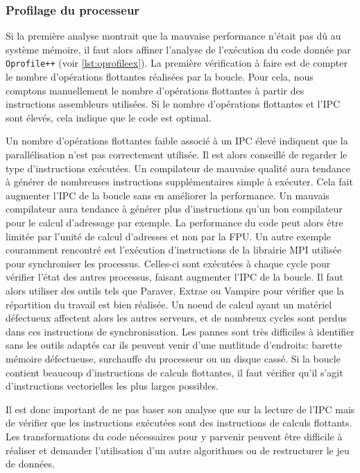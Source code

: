         
        
        \subsubsection{Profilage du processeur}
        
            Si la première analyse montrait que la mauvaise performance n'était pas dû au système mémoire, il faut alors affiner l'analyse de l'exécution du code donnée par \verb=Oprofile++= (voir \autoref{lst:oprofileex}).
            La première vérification à faire est de compter le nombre d'opérations flottantes réalisées par la boucle. Pour cela, nous comptons manuellement le nombre d'opérations flottantes à partir des instructions assembleurs utilisées. Si le nombre d'opérations flottantes et l'IPC sont élevés, cela indique que le code est optimal. 
            
            Un nombre d'opérations flottantes faible associé à un IPC élevé indiquent que la parallélisation n'est pas correctement utilisée. Il est alors conseillé de regarder le type d'instructions exécutées.
                Un compilateur de mauvaise qualité aura tendance à générer de nombreuses instructions supplémentaires simple à exécuter. Cela fait augmenter l'IPC de la boucle sans en améliorer la performance. Un mauvais compilateur aura tendance à générer plus d'instructions qu'un bon compilateur pour le calcul d'adressage par exemple. La performance du code peut alors être limitée par l'unité de calcul d'adresses et non par la FPU.
                Un autre exemple couramment rencontré est l'exécution d'instructions de la librairie MPI utilisée pour synchroniser les processus. Celles-ci sont exécutées à chaque cycle pour vérifier l'état des autres processus, faisant augmenter l'IPC de la boucle. Il faut alors utiliser des outils tels que Paraver, Extrae ou Vampire pour vérifier que la répartition du travail est bien réalisée. Un noeud de calcul ayant un matériel défectueux affectent alors les autres serveurs, et de nombreux cycles sont perdus dans ces instructions de synchronisation. Les pannes sont très difficiles à identifier sans les outils adaptés car ils peuvent venir d'une mutlitude d'endroits: barette mémoire défectueuse, surchauffe du processeur ou un disque cassé.
                Si la boucle contient beaucoup d'instructions de calculs flottantes, il faut vérifier qu'il s'agit d'instructions vectorielles les plus larges possibles.
            
            Il est donc important de ne pas baser son analyse que sur la lecture de l'IPC mais de vérifier que les instructions exécutées sont des instructions de calculs flottants. Les transformations du code nécessaires pour y parvenir peuvent être difficile à réaliser et demander l'utilisation d'un autre algorithmes ou de restructurer le jeu de données.
            


